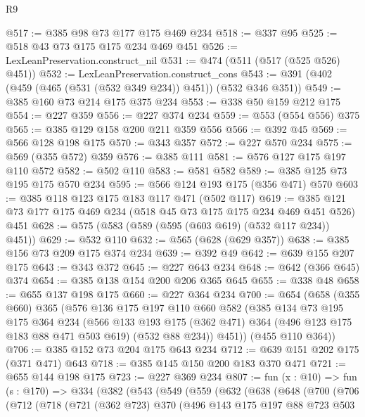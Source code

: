 \begin{lexlean}{R9}
\begin{coremodule}
{{{{{@517 := @385 @98 @73 @177 @175 @469 @234
@518 := @337 @95
@525 := @518 @43 @73 @175 @175 @234 @469 @451
@526 := LexLeanPreservation.construct_nil
@531 := @474 (@511 (@517 (@525 @526) @451))
@532 := LexLeanPreservation.construct_cons
@543 := @391 (@402 (@459 (@465 (@531 (@532 @349 @234)) @451)) (@532 @346 @351))
@549 := @385 @160 @73 @214 @175 @375 @234
@553 := @338 @50 @159 @212 @175
@554 := @227 @359
@556 := @227 @374 @234
@559 := @553 (@554 @556) @375
@565 := @385 @129 @158 @200 @211 @359 @556
@566 := @392 @45
@569 := @566 @128 @198 @175
@570 := @343 @357
@572 := @227 @570 @234
@575 := @569 (@355 @572) @359
@576 := @385 @111
@581 := @576 @127 @175 @197 @110 @572
@582 := @502 @110
@583 := @581 @582
@589 := @385 @125 @73 @195 @175 @570 @234
@595 := @566 @124 @193 @175 (@356 @471) @570
@603 := @385 @118 @123 @175 @183 @117 @471 (@502 @117)
@619 := @385 @121 @73 @177 @175 @469 @234 (@518 @45 @73 @175 @175 @234 @469 @451 @526) @451
@628 := @575 (@583 (@589 (@595 (@603 @619) (@532 @117 @234)) @451))
@629 := @532 @110
@632 := @565 (@628 (@629 @357))
@638 := @385 @156 @73 @209 @175 @374 @234
@639 := @392 @49
@642 := @639 @155 @207 @175
@643 := @343 @372
@645 := @227 @643 @234
@648 := @642 (@366 @645) @374
@654 := @385 @138 @154 @200 @206 @365 @645
@655 := @338 @48
@658 := @655 @137 @198 @175
@660 := @227 @364 @234
@700 := @654
    (@658
      (@355 @660)
      @365
      (@576
        @136
        @175
        @197
        @110
        @660
        @582
        (@385
          @134
          @73
          @195
          @175
          @364
          @234
          (@566
            @133
            @193
            @175
            (@362 @471)
            @364
            (@496 @123 @175 @183 @88 @471 @503 @619)
            (@532 @88 @234))
          @451))
      (@455 @110 @364))
@706 := @385 @152 @73 @204 @175 @643 @234
@712 := @639 @151 @202 @175 (@371 @471) @643
@718 := @385 @145 @150 @200 @183 @370 @471
@721 := @655 @144 @198 @175
@723 := @227 @369 @234
@807 := fun (x : @10) =>
  fun (s : @170) =>
  @334
    (@382
      (@543
        (@549
          (@559
            (@632
              (@638
                (@648
                  (@700
                    (@706
                      (@712
                        (@718
                          (@721
                            (@362 @723)
                            @370
                            (@496
                              @143
                              @175
                              @197
                              @88
                              @723
                              @503
}}}}}
\end{coremodule}
\end{lexlean}
